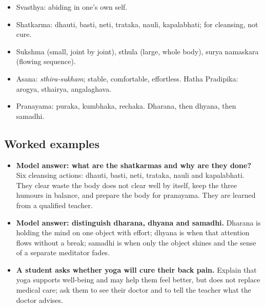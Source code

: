 \begin{recall}
\begin{itemize}
\item Svasthya: abiding in one's own self.
\item Shatkarma: dhauti, basti, neti, trataka, nauli, kapalabhati; for cleansing, not cure.
\item Sukshma (small, joint by joint), sthula (large, whole body), surya namaskara (flowing sequence).
\item Asana: \emph{sthira-sukham}; stable, comfortable, effortless. Hatha Pradipika: arogya, sthairya, angalaghava.
\item Pranayama: puraka, kumbhaka, rechaka. Dharana, then dhyana, then samadhi.
\end{itemize}
\end{recall}

\subsection*{Worked examples}
\begin{itemize}
\item \textbf{Model answer: what are the shatkarmas and why are they done?} Six cleansing actions: dhauti, basti, neti, trataka, nauli and kapalabhati. They clear waste the body does not clear well by itself, keep the three humours in balance, and prepare the body for pranayama. They are learned from a qualified teacher.
\item \textbf{Model answer: distinguish dharana, dhyana and samadhi.} Dharana is holding the mind on one object with effort; dhyana is when that attention flows without a break; samadhi is when only the object shines and the sense of a separate meditator fades.
\item \textbf{A student asks whether yoga will cure their back pain.} Explain that yoga supports well-being and may help them feel better, but does not replace medical care; ask them to see their doctor and to tell the teacher what the doctor advises.
\end{itemize}

